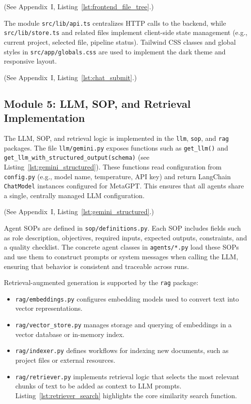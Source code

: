 (See Appendix~I, Listing~\ref{lst:frontend_file_tree}.)

The module \texttt{src/\allowbreak{}lib/\allowbreak{}api.ts} centralizes HTTP calls to the backend, while \texttt{src/\allowbreak{}lib/\allowbreak{}store.ts} and related files implement client-side state management (e.g., current project, selected file, pipeline status). Tailwind CSS classes and global styles in \texttt{src/\allowbreak{}app/\allowbreak{}globals.css} are used to implement the dark theme and responsive layout.


(See Appendix~I, Listing~\ref{lst:chat_submit}.)


\subsection*{Module 5: LLM, SOP, and Retrieval Implementation}

The LLM, SOP, and retrieval logic is implemented in the \texttt{llm}, \texttt{sop}, and \texttt{rag} packages. The file \texttt{llm/\allowbreak{}gemini.py} exposes functions such as \texttt{get\_\allowbreak{}llm()} and \texttt{get\_\allowbreak{}llm\_\allowbreak{}with\_\allowbreak{}structured\_\allowbreak{}output(schema)} (see Listing~\ref{lst:gemini_structured}). These functions read configuration from \texttt{config.py} (e.g., model name, temperature, API key) and return LangChain \texttt{ChatModel} instances configured for MetaGPT. This ensures that all agents share a single, centrally managed LLM configuration.

(See Appendix~I, Listing~\ref{lst:gemini_structured}.)

Agent SOPs are defined in \texttt{sop/\allowbreak{}definitions.py}. Each SOP includes fields such as role description, objectives, required inputs, expected outputs, constraints, and a quality checklist. The concrete agent classes in \texttt{agents/\allowbreak{}*.py} load these SOPs and use them to construct prompts or system messages when calling the LLM, ensuring that behavior is consistent and traceable across runs.

Retrieval-augmented generation is supported by the \texttt{rag} package:
\begin{itemize}
    \item \texttt{rag/\allowbreak{}embeddings.py} configures embedding models used to convert text into vector representations.
    \item \texttt{rag/\allowbreak{}vector\_\allowbreak{}store.py} manages storage and querying of embeddings in a vector database or in-memory index.
    \item \texttt{rag/\allowbreak{}indexer.py} defines workflows for indexing new documents, such as project files or external resources.
    \item \texttt{rag/\allowbreak{}retriever.py} implements retrieval logic that selects the most relevant chunks of text to be added as context to LLM prompts. Listing~\ref{lst:retriever_search} highlights the core similarity search function.
\end{itemize}

